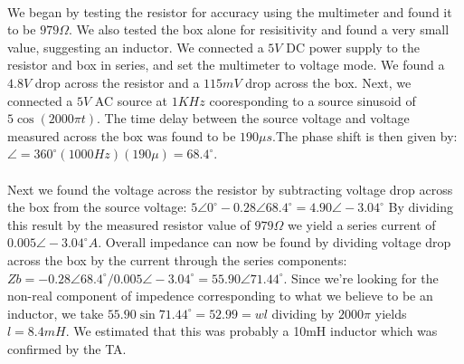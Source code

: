 \documentclass{article}
\begin{document}
\paragraph{}
We began by testing the resistor for accuracy using the multimeter and found it to be $979\Omega{}$. We also tested the box alone for resisitivity and found a very small value, suggesting an inductor. We connected a $5V$ DC power supply to the resistor and box in series, and set the multimeter to voltage mode. We found a $4.8V$ drop across the resistor and a $115mV$ drop across the box. Next, we connected a $5V$ AC source at $1KHz$ cooresponding to a source sinusoid of $5\cos{}(2000\pi{} t)$. The time delay between the source voltage and voltage measured across the box was found to be $190\mu{} s$.The phase shift is then given by: $\angle{} = 360^\circ{}(1000Hz)(190\mu{}) = 68.4^\circ{}$. 

\paragraph{} 
Next we found the voltage across the resistor by subtracting voltage drop across the box from the source voltage: $5\angle{}0^\circ{} - 0.28\angle{}68.4^\circ{} = 4.90\angle{}-3.04^\circ{}$ By dividing this result by the measured resistor value of $979\Omega$ we yield a series current of $0.005\angle{}-3.04^\circ{}A$. Overall impedance can now be found by dividing voltage drop across the box by the current through the series components: $Zb= -0.28\angle{}68.4^\circ{} / 0.005\angle{}-3.04^\circ{} = 55.90\angle{}71.44^\circ{}$. Since we're looking for the non-real component of impedence corresponding to what we believe to be an inductor, we take $55.90\sin{}71.44^\circ{} = 52.99 = wl$ dividing by $2000\pi{}$ yields $l=8.4mH$. We estimated that this was probably a 10mH inductor which was confirmed by the TA.   
\end{document}
